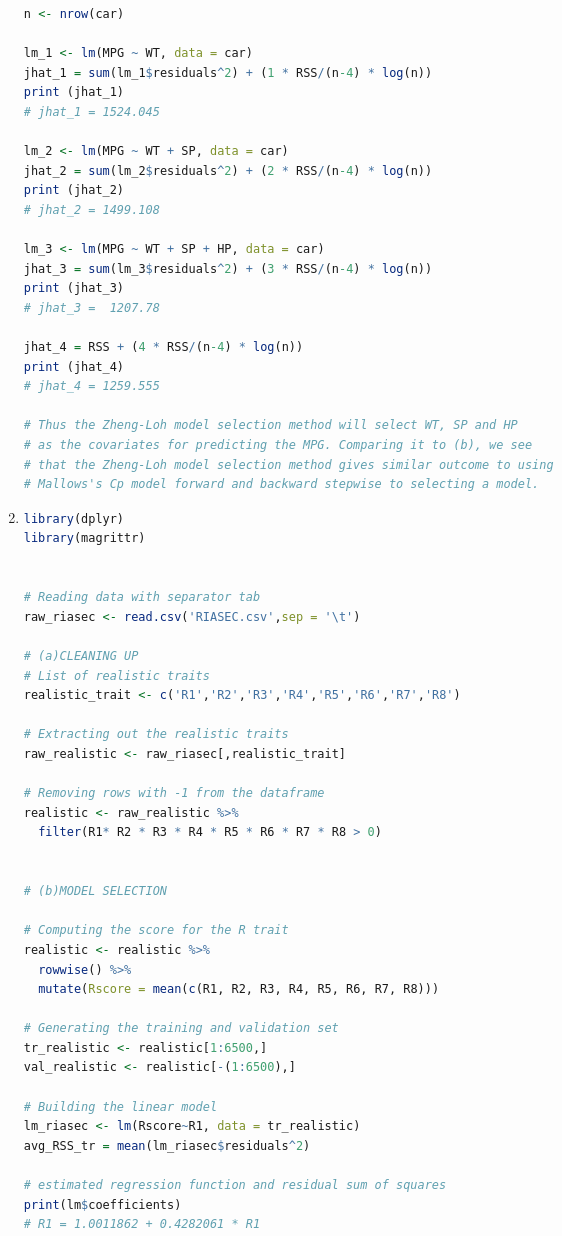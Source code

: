 \documentclass[a4paper,10pt]{article}
\theoremstyle{definition}
\begin{document}
\begin{enumerate}
\begin{lstlisting}[language=R,commentstyle=\fontseries{lc}\color{gray}]
n <- nrow(car)

lm_1 <- lm(MPG ~ WT, data = car)
jhat_1 = sum(lm_1$residuals^2) + (1 * RSS/(n-4) * log(n))
print (jhat_1)
# jhat_1 = 1524.045

lm_2 <- lm(MPG ~ WT + SP, data = car)
jhat_2 = sum(lm_2$residuals^2) + (2 * RSS/(n-4) * log(n))
print (jhat_2)
# jhat_2 = 1499.108

lm_3 <- lm(MPG ~ WT + SP + HP, data = car)
jhat_3 = sum(lm_3$residuals^2) + (3 * RSS/(n-4) * log(n)) 
print (jhat_3)
# jhat_3 =  1207.78

jhat_4 = RSS + (4 * RSS/(n-4) * log(n)) 
print (jhat_4)
# jhat_4 = 1259.555

# Thus the Zheng-Loh model selection method will select WT, SP and HP 
# as the covariates for predicting the MPG. Comparing it to (b), we see
# that the Zheng-Loh model selection method gives similar outcome to using
# Mallows's Cp model forward and backward stepwise to selecting a model.\end{lstlisting}
\newpage

\item
\begin{lstlisting}[language=R,commentstyle=\fontseries{lc}\color{gray}]
library(dplyr)
library(magrittr)


# Reading data with separator tab
raw_riasec <- read.csv('RIASEC.csv',sep = '\t')

# (a)CLEANING UP
# List of realistic traits
realistic_trait <- c('R1','R2','R3','R4','R5','R6','R7','R8')

# Extracting out the realistic traits
raw_realistic <- raw_riasec[,realistic_trait]

# Removing rows with -1 from the dataframe
realistic <- raw_realistic %>%
  filter(R1* R2 * R3 * R4 * R5 * R6 * R7 * R8 > 0)
  

# (b)MODEL SELECTION

# Computing the score for the R trait
realistic <- realistic %>%
  rowwise() %>%
  mutate(Rscore = mean(c(R1, R2, R3, R4, R5, R6, R7, R8))) 

# Generating the training and validation set 
tr_realistic <- realistic[1:6500,]
val_realistic <- realistic[-(1:6500),]

# Building the linear model
lm_riasec <- lm(Rscore~R1, data = tr_realistic)
avg_RSS_tr = mean(lm_riasec$residuals^2)

# estimated regression function and residual sum of squares
print(lm$coefficients)
# R1 = 1.0011862 + 0.4282061 * R1



\end{lstlisting}
\end{enumerate}
\end{document}
